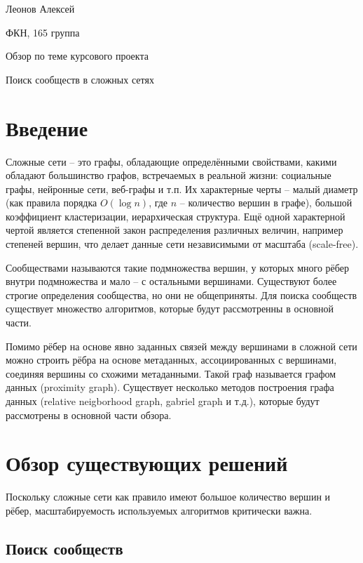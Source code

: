 \documentclass{article}
\begin{document}
	\begin{flushright}
	 \large{Леонов Алексей}
	 
	 \large{ФКН, 165 группа}
	\end{flushright}	    
    \begin{center}
    	\Large{Обзор по теме курсового проекта}
    	
    	\LARGE{Поиск сообществ в сложных сетях}
    \end{center}

\section*{Введение}

Сложные сети -- это графы, обладающие определёнными свойствами, какими обладают большинство графов, встречаемых в реальной жизни: социальные графы, нейронные сети, веб-графы и т.п.
Их характерные черты -- малый диаметр (как правила порядка $O(\log n)$, где $n$ -- количество вершин в графе), большой коэффициент кластеризации, иерархическая структура. Ещё одной характерной чертой является степенной закон распределения различных величин, например степеней вершин, что делает данные сети независимыми от масштаба (scale-free)\cite{comp_netw}.

Сообществами называются такие подмножества вершин, у которых много рёбер внутри подмножества и мало -- с остальными вершинами\cite{fortunado_small, fortunado_big}. Существуют более строгие определения сообщества, но они не общеприняты.
Для поиска сообществ существует множество алгоритмов, которые будут рассмотренны в основной части.

Помимо рёбер на основе явно заданных связей между вершинами в сложной сети можно строить рёбра на основе метаданных, ассоциированных с вершинами, соединяя вершины со схожими метаданными. Такой граф называется графом данных (proximity graph). Существует несколько методов построения графа данных\cite{prox_gr} (relative neigborhood graph, gabriel graph и т.д.), которые будут рассмотрены в основной части обзора.

\section*{Обзор существующих решений}

Поскольку сложные сети как правило имеют большое количество вершин и рёбер, масштабируемость используемых алгоритмов критически важна.


\subsection*{Поиск сообществ}
\end{document}
